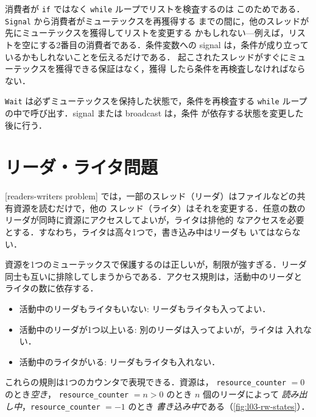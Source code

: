 \documentclass[../main.tex]{subfiles}
\begin{document}
消費者が \texttt{if} ではなく \texttt{while} ループでリストを検査するのは
このためである．\texttt{Signal} から消費者がミューテックスを再獲得する
までの間に，他のスレッドが先にミューテックスを獲得してリストを変更する
かもしれない---例えば，リストを空にする2番目の消費者である．条件変数への
signal は，条件が成り立っているかもしれないことを伝えるだけである．
起こされたスレッドがすぐにミューテックスを獲得できる保証はなく，獲得
したら条件を再検査しなければならない．

\begin{keypoint}
  \texttt{Wait} は必ずミューテックスを保持した状態で，条件を再検査する
  \texttt{while} ループの中で呼び出す．signal または broadcast は，条件
  が依存する状態を変更した後に行う．
\end{keypoint}

\section{リーダ・ライタ問題}
\label{sec:l03-rw}

[readers-writers problem]%
では，一部のスレッド（リーダ）はファイルなどの共有資源を読むだけで，他の
スレッド（ライタ）はそれを変更する．任意の数のリーダが同時に資源にアクセスしてよいが，ライタは排他的
なアクセスを必要とする．すなわち，ライタは高々1つで，書き込み中はリーダも
いてはならない．

資源を1つのミューテックスで保護するのは正しいが，制限が強すぎる．リーダ
同士も互いに排除してしまうからである．アクセス規則は，活動中のリーダと
ライタの数に依存する．
\begin{itemize}
  \item 活動中のリーダもライタもいない: リーダもライタも入ってよい．
  \item 活動中のリーダが1つ以上いる: 別のリーダは入ってよいが，ライタは
    入れない．
  \item 活動中のライタがいる: リーダもライタも入れない．
\end{itemize}
これらの規則は1つのカウンタで表現できる．資源は，
\texttt{resource\_counter} $=0$ のとき\emph{空き}，
\texttt{resource\_counter} $=n>0$ のとき $n$ 個のリーダによって
\emph{読み出し中}，\texttt{resource\_counter} $=-1$ のとき
\emph{書き込み中}である（\cref{fig:l03-rw-states}）．
\end{document}
